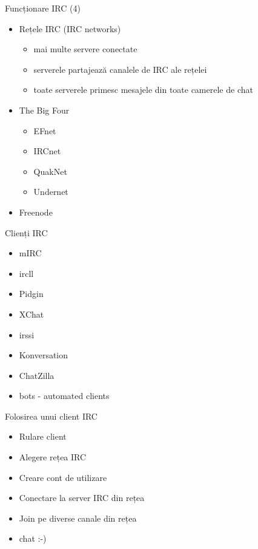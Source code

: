 \documentclass{beamer}
\begin{document}
    \begin{frame}{Funcționare IRC (4)}
    \begin{itemize}
    \setlength{\itemsep}{0.5cm}
    \item Rețele IRC (IRC networks)
        \begin{itemize}
        \item mai multe servere conectate
        \item serverele partajează canalele de IRC ale rețelei
        \item toate serverele primesc mesajele din toate camerele de chat
        \end{itemize}
    \item The Big Four
        \begin{itemize}
        \item EFnet
        \item IRCnet
        \item QuakNet
        \item Undernet
        \end{itemize}
    \item Freenode
    \end{itemize}
    \end{frame}

    \begin{frame}{Clienți IRC}
    \begin{itemize}
    \setlength{\itemsep}{0.3cm}
    \item mIRC
    \item ircll
    \item Pidgin
    \item XChat
    \item irssi
    \item Konversation
    \item ChatZilla
    \item bots - automated clients
    \end{itemize}
    \end{frame}

    \begin{frame}{Folosirea unui client IRC}
    \begin{itemize}
    \setlength{\itemsep}{0.5cm}
    \item Rulare client
    \item Alegere rețea IRC
    \item Creare cont de utilizare
    \item Conectare la server IRC din rețea
    \item Join pe diverse canale din rețea
    \item chat :-)
    \end{itemize}
    \end{frame}
\end{document}
